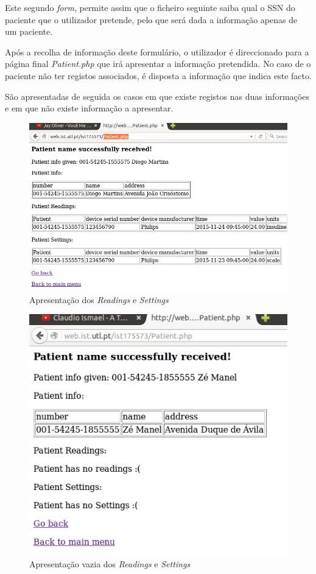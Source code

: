 \documentclass[a4paper]{article}
\begin{document}
Este segundo \textit{form}, permite assim que o ficheiro seguinte saiba qual o SSN do paciente que o utilizador pretende, pelo que será dada a informação apenas de um paciente.

Após a recolha de informação deste formulário, o utilizador é direccionado para a página final \textit{Patient.php} que irá apresentar a informação pretendida. No caso de o paciente não ter registos associados, é disposta a informação que indica este facto.

São apresentadas de seguida os casos em que existe registos nas duas informações e em que não existe informação a apresentar.

\begin{figure}[ht!]
\centering
\includegraphics[scale=0.53]{diogo.png}
\caption{Apresentação dos \textit{Readings} e \textit{Settings}}
\end{figure}

\begin{figure}[ht!]
\centering
\includegraphics[scale=0.53]{ze.png}
\caption{Apresentação vazia dos \textit{Readings} e \textit{Settings}}
\end{figure}
\end{document}
